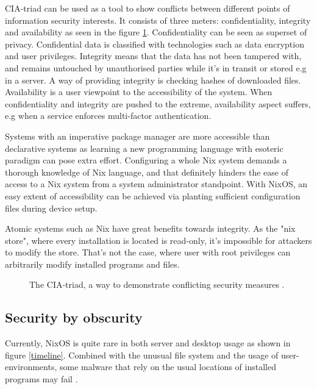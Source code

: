 CIA-triad can be used as a tool to show conflicts between different
points of information security interests. It consists of three meters:
confidentiality, integrity and availability as seen in the figure
\ref{ciatriad}. Confidentiality can be seen as superset of
privacy. Confidential data is classified with technologies such as
data encryption and user privileges. Integrity means that the data has
not been tampered with, and remains untouched by unauthorised parties
while it's in transit or stored e.g in a server. A way of providing
integrity is checking hashes of downloaded files. Availability is a
user viewpoint to the accessibility of the system. When
confidentiality and integrity are pushed to the extreme, availability
aspect suffers, e.g when a service enforces multi-factor
authentication. \cite{pender2019parkerian}

Systems with an imperative package manager are more accessible than
declarative systems as learning a new programming language with
esoteric paradigm can pose extra effort. Configuring a whole Nix
system demands a thorough knowledge of Nix language, and that
definitely hinders the ease of access to a Nix system from a system
administrator standpoint. With NixOS, an easy extent of
accessibility can be achieved via planting sufficient configuration
files during device setup.

Atomic systems such as Nix have great benefits towards integrity. As
the "nix store", where every installation is located is read-only,
it's impossible for attackers to modify the store. That's not the
case, where user with root privileges can arbitrarily modify installed
programs and files.

\begin{figure}[t!]
\centerline{}
\caption{The CIA-triad, a way to demonstrate conflicting security
  measures \cite{hughes2013quantitative}.}
\label{ciatriad}
\end{figure}
\subsection{Security by obscurity}

Currently, NixOS is quite rare in both server and desktop usage as
shown in figure \ref{timeline}. Combined with the unusual file system
and the usage of user-environments, some malware that rely on the
usual locations of installed programs may fail
\cite{nixosSecurityNixOS}.

